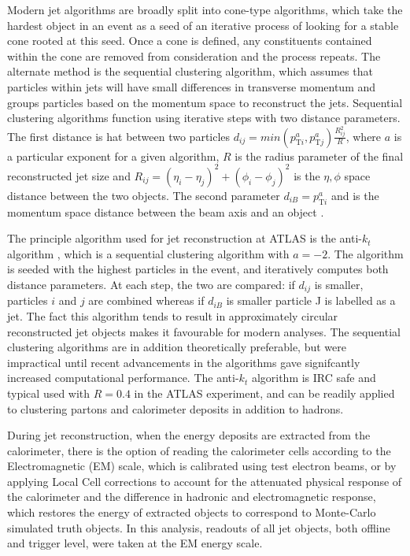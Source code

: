 	Modern jet algorithms are broadly split into cone-type algorithms, which take the hardest object in an event as a seed of an iterative process of looking for a stable cone rooted at this seed. Once a cone is defined, any constituents contained within the cone are removed from consideration and the process repeats. The alternate method is the sequential clustering algorithm, which assumes that particles within jets will have small differences in transverse momentum and groups particles based on the momentum space to reconstruct the jets. Sequential clustering algorithms function using iterative steps with two distance parameters. The first distance is hat between two particles $d_{ij} = min(p_{\text{T}i}^a, p_{\text{T}j}^a)\frac{R_{ij}^2}{R}$, where $a$ is a particular exponent for a given algorithm, $R$ is the radius parameter of the final reconstructed jet size and $R_{ij}=(\eta_i - \eta_j)^2 + (\phi_i - \phi_j)^2$ is the $\eta, \phi$ space distance between the two objects. The second parameter $d_{iB} = p_{\text{T}i}^a$ and is the momentum space distance between the beam axis and an object \cite{jetreco}.

	The principle algorithm used for jet reconstruction at ATLAS is the anti-$k_t$ algorithm \cite{antikt}, which is a sequential clustering algorithm with $a=-2$. The algorithm is seeded with the highest \pt particles in the event, and iteratively computes both distance parameters. At each step, the two are compared: if $d_{ij}$ is smaller, particles $i$ and $j$ are combined whereas if $d_{iB}$ is smaller particle J is labelled as a jet. The fact this algorithm tends to result in approximately circular reconstructed jet objects makes it favourable for modern analyses. The sequential clustering algorithms are in addition theoretically preferable, but were impractical until recent advancements in the algorithms gave signifcantly increased computational performance. The anti-$k_t$ algorithm is IRC safe and typical used with $R=0.4$ in the ATLAS experiment, and can be readily applied to clustering partons and calorimeter deposits in addition to hadrons.

	During jet reconstruction, when the energy deposits are extracted from the calorimeter, there is the option of reading the calorimeter cells according to the Electromagnetic (EM) scale, which is calibrated using test electron beams, or by applying Local Cell corrections to account for the attenuated physical response of the calorimeter and the difference in hadronic and electromagnetic response, which restores the energy of extracted objects to correspond to Monte-Carlo simulated truth objects. In this analysis, readouts of all jet objects, both offline and trigger level, were taken at the EM energy scale.

